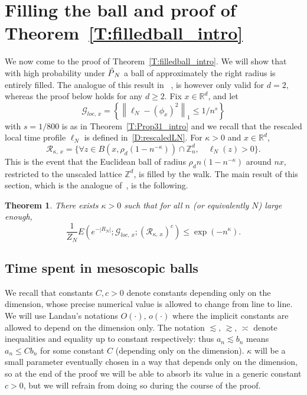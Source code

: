 \documentclass[10pt]{amsart}
\newtheorem{theo}{Theorem}[section]
\theoremstyle{definition}\newtheorem{defi}[theo]{Definition}\newtheorem{rema}[theo]{Remark}\newtheorem{exam}[theo]{Example}\newtheorem{exem}[theo]{Example}\newtheorem{nota}[theo]{Notation}
\newcommand*\Z {{\mathbb Z}}
\newcommand*\R{\mathbb{R}}
\newcommand*\E {{E}}
\newcommand*\wP{\smash{\widetilde P}}
\newcommand{\cG}{\mathcal{G}}
\newcommand{\cR}{\mathcal{R}}
\let\oldforall\forall
\renewcommand*{\forall}{\mathrel{\oldforall}}
\begin{document}
\section{Filling the ball and proof of Theorem~\ref{T:filledball_intro} }
\label{S:filling}

We now come to the proof of Theorem~\ref{T:filledball_intro}. We will show that with high probability under $\wP_N$ a ball of approximately the right radius is entirely filled. The analogue of this result in~\cite[Proposition~4.1]{BO} , is however only valid for $d=2$, whereas the proof below holds for any $d \ge 2$. Fix $x \in \R^d$, and let
\[
\cG_{loc,\,x} = \left\{ \left\|\ell_N - (\phi_x)^2 \right\|_1 \le 1/ n^{s}\right \}
\]
with $s = 1/800$ is as in Theorem~\ref{T:Prop31_intro} and we recall that the rescaled local time profile $\ell_N$ is defined in~\eqref{D:rescaledLN}. For $\kappa>0$ and $x \in \R^d$,
\[
\cR_{\kappa,\,x} = \big\{\forall z \in B\left(x, \rho_d (1 - n^{- \kappa})\right) \cap \Z_n^d,\quad \ell_N(z)>0 \big \}.
\]
This is the event that the Euclidean ball of radius $\rho_d n (1 - n^{-\kappa})$ around $nx$, restricted to the unscaled lattice $\mathbb{Z}^d$, is filled by the walk. The main result of this section, which is the analogue of~\cite[Proposition~4.1]{BO}, is the following.

\begin{theo}\label{T:filledball}
There exists $\kappa>0$ such that for all $n$ (or equivalently $N$) large enough,
\[
\frac1{Z_N}\E\left(e^{ - |R_N|} ; \cG_{loc,\,x} ; (\cR_{\kappa,\,x})^c\right) \le \exp(- n^{\kappa}).
\]
\end{theo}


\subsection{Time spent in mesoscopic balls}\label{S:time_meso}

We recall that constants $C, c>0$ denote constants depending only on the dimension, whose precise numerical value is allowed to change from line to line. We will use Landau's notations $O(\cdot),\,o(\cdot)$ where the implicit constants are allowed to depend on the dimension only. The notation $\lesssim,\,\gtrsim,\,\asymp$ denote inequalities and equality up to constant respectively: thus $a_n \lesssim b_n$ means $a_n \le C b_n$ for some constant $C$ (depending only on the dimension). $\kappa$ will be a small parameter eventually chosen in a way that depends only on the dimension, so at the end of the proof we will be able to absorb its value in a generic constant $c>0$, but we will refrain from doing so during the course of the proof.
\end{document}
